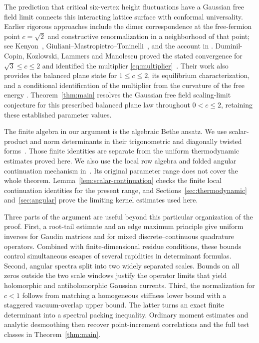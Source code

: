 The prediction that critical six-vertex height fluctuations have a Gaussian
free field limit connects this interacting lattice surface with conformal
universality. Earlier rigorous approaches include the dimer correspondence
at the free-fermion point \(c=\sqrt2\) and constructive renormalization in
a neighborhood of that point; see Kenyon~\cite{Kenyon2000},
Giuliani--Mastropietro--Toninelli~\cite{GMT2017}, and the account in
\cite[Section~2.4]{DKLM2026}.
Duminil-Copin, Kozlowski, Lammers and Manolescu proved the stated convergence
for \(\sqrt3\le c\le2\) and identified the multiplier
\eqref{eq:multiplier}~\cite[Theorem~2.8]{DKLM2026}.
Their work also provides the balanced plane state for \(1\le c\le2\),
its equilibrium characterization, and a conditional identification of the
multiplier from the curvature of the free energy
\cite[Theorem~2.2, the paragraph after (6), and Theorems~4.3--4.4]{DKLM2026}.
Theorem~\ref{thm:main} resolves the Gaussian free field scaling-limit
conjecture for this prescribed balanced plane law throughout \(0<c\le2\),
retaining these established parameter values.

The finite algebra in our argument is the algebraic Bethe ansatz.
We use scalar-product and norm determinants in their trigonometric and
diagonally twisted forms~\cite{Slavnov1989,KMT1999,KMST2005}.
Those finite identities are separate from the uniform thermodynamic
estimates proved here. We also use the local row algebra and folded angular
continuation mechanism in~\cite[Section on angular transfer]{AngularRepository2026}.
Its original parameter range does not cover the whole theorem.
Lemma~\ref{lem:scalar-continuation} checks the finite local continuation
identities for the present range, and Sections~\ref{sec:thermodynamic}
and~\ref{sec:angular} prove the limiting kernel estimates used here.

Three parts of the argument are useful beyond this particular organization
of the proof. First, a root-tail estimate and an edge maximum principle
give uniform inverses for Gaudin matrices and for mixed discrete--continuous
quadrature operators. Combined with finite-dimensional residue conditions,
these bounds control simultaneous escapes of several rapidities in
determinant formulas. Second, angular spectra split into two widely
separated scales. Bounds on all zeros outside the two scale windows
justify the operator limits that yield holomorphic and antiholomorphic
Gaussian currents. Third, the normalization for \(c<1\) follows from
matching a homogeneous stiffness lower bound with a staggered
vacuum-overlap upper bound. The latter turns an exact finite determinant
into a spectral packing inequality. Ordinary moment estimates and analytic
desmoothing then recover point-increment correlations and the full test
classes in Theorem~\ref{thm:main}.

